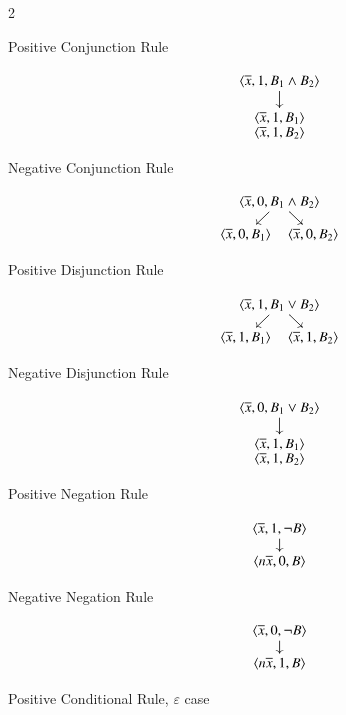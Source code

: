 \documentclass{amsart}
\theoremstyle{definition}
\begin{document}
\begin{multicols}{2}\begin{description}
    \item[Positive Conjunction Rule] 
    \begin{displaymath}
        \xymatrix@C=-10mm@R=3mm{\langle\overline{x},1,B_1\land B_2\rangle\ar[d] \\
        \txt{$\langle\overline{x},1,B_1\rangle$ \\ $\langle\overline{x},1,B_2\rangle$}}
    \end{displaymath}
    \item[Negative Conjunction Rule]
    \begin{displaymath}
        \xymatrix@C=-10mm@R=3mm{ & \langle\overline{x},0,B_1\land B_2\rangle\ar[dr]\ar[dl] & \\
        \langle\overline{x},0,B_1\rangle & & \langle\overline{x},0,B_2\rangle}
    \end{displaymath}
    \item[Positive Disjunction Rule]
    \begin{displaymath}
        \xymatrix@C=-10mm@R=3mm{ & \langle\overline{x},1,B_1\lor B_2\rangle\ar[dr]\ar[dl] & \\
        \langle\overline{x},1,B_1\rangle & & \langle\overline{x},1,B_2\rangle}
    \end{displaymath}
    \item[Negative Disjunction Rule]
    \begin{displaymath}
        \xymatrix@C=-10mm@R=3mm{\langle\overline{x},0,B_1\lor B_2\rangle\ar[d] \\
        \txt{$\langle\overline{x},1,B_1\rangle$ \\ $\langle\overline{x},1,B_2\rangle$} }
    \end{displaymath}
    \item[Positive Negation Rule] 
    \begin{displaymath}
        \xymatrix@C=-10mm@R=3mm{\langle\overline{x},1,\neg B\rangle\ar[d] \\
        \langle n\overline{x},0,B\rangle}
    \end{displaymath}
    \item[Negative Negation Rule] 
    \begin{displaymath}
        \xymatrix@C=-10mm@R=3mm{\langle\overline{x},0,\neg B\rangle\ar[d] \\
        \langle n\overline{x},1,B\rangle}
    \end{displaymath}
    \item[Positive Conditional Rule, $\varepsilon$ case]

\end{description}
\end{multicols}
\end{document}
